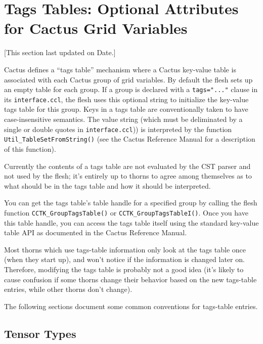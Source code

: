 \section{Tags Tables: Optional Attributes for Cactus Grid Variables}

[This section last updated on $ $Date$ $.]

Cactus defines a ``tags table'' mechanism where a Cactus key-value
table is associated with each Cactus group of grid variables.
By default the flesh sets up an empty table for each group. If a group is
declared with a \verb|tags="..."| clause in its \verb|interface.ccl|,
the flesh uses this optional string to initialize the key-value tags table
for this group.
Keys in a tags table are conventionally taken to have case-insensitive
semantics.  The value string (which must be deliminated by a single or double
quotes in \verb|interface.ccl|)) is interpreted by the function
\verb|Util_TableSetFromString()| (see the Cactus Reference Manual
for a description of this function).

Currently the contents of a tags table are not evaluated by the CST
parser and not used by the flesh; it's entirely up to thorns to agree
among themselves as to what should be in the tags table and how it
should be interpreted.

You can get the tags table's table handle for a specified group
by calling the flesh function \verb|CCTK_GroupTagsTable()| or
\verb|CCTK_GroupTagsTableI()|.  Once you have this table handle,
you can access the tags table itself using the standard key-value
table API as documented in the Cactus Reference Manual.  

Most thorns which use tags-table information only look at the tags
table once (when they start up), and won't notice if the information
is changed later on.  Therefore, modifying the tags table is probably
not a good idea (it's likely to cause confusion if some thorns change
their behavior based on the new tags-table entries, while other thorns
don't change).

The following sections document some common conventions for tags-table
entries.


\subsection{Tensor Types}

